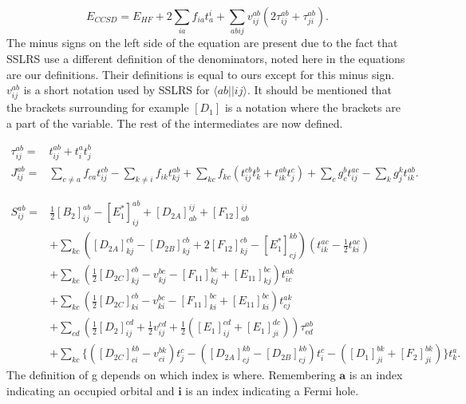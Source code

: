 \begin{equation}
E_{CCSD} = E_{HF} + 2\sum_{ia} f_{ia} t_a^i 
+ \sum_{abij} v_{ij}^{ab} ( 2 \tau_{ij}^{ab}
+ \tau_{ji}^{ab} ) . \label{SSRS3}
\end{equation}
The minus signs on the left side of the equation are present due to the fact that SSLRS use a different definition of the denominators, noted here in the equations are our definitions. Their definitions is equal to ours except for this minus sign. \\

$v_{ij}^{ab}$ is a short notation used by SSLRS for $\langle ab || ij \rangle$. It should be mentioned that the brackets surrounding for example $[D_1]$ is a notation where the brackets are a part of the variable. The rest of the intermediates are now defined.

\begin{align}
\tau_{ij}^{ab} = & t_{ij}^{ab} + t_i^a t_j^b
\\ 
J_{ij}^{ab} = &
\sum_{c \not= a} f_{ca} t_{ij}^{cb}
- \sum_{k \not= i} f_{ik} t_{kj}^{ab}
+ \sum_{kc} f_{kc} (t_{ij}^{cb} t_k^b + t_{ik}^{ab} t_j^c )
+ \sum_c g_c^b t_{ij}^{ac} - \sum_k g_j^k t_{ik}^{ab} .
\end{align}

\begin{align}
S_{ij}^{ab} = & 
\frac{1}{2} [B_2]_{ij}^{ab}
- [E_1^*]_{ij}^{ab}
+ [D_{2A}]_{ab}^{ij}
+ [F_{12}]_{ab}^{ij} 
 \\ &
+ \sum_{kc} (
[D_{2A}]_{kj}^{cb} - [D_{2B}]_{kj}^{cb}
+ 2[F_{12}]_{kj}^{cb}
- [E_1^*]_{cj}^{kb} )
( t_{ik}^{ac} - \frac{1}{2} t_{ki}^{ac} )
\nonumber \\ &
+ \sum_{kc} (\frac{1}{2} [D_{2C}]_{kj}^{cb}
- v_{kj}^{bc} - [F_{11}]_{kj}^{bc} + [E_{11}]_{kj}^{bc}) t_{ic}^{ak}
\nonumber \\ &
+ \sum_{kc} (\frac{1}{2} [D_{2C}]_{ki}^{cb} - v_{ki}^{bc} - [F_{11}]_{ki}^{bc} 
+ [E_{11}]_{ki}^{bc} ) t_{cj}^{ak}
\nonumber \\ &
+ \sum_{cd} ( \frac{1}{2} [D_2]_{ij}^{cd} 
+ \frac{1}{2} v_{ij}^{cd} + \frac{1}{2} (
[E_1]_{ij}^{cd} + [E_1]_{ji}^{dc}))
\tau_{cd}^{ab}
\nonumber \\ &
+ \sum_{kc} \{
([D_{2C}]_{ci}^{kb} - v_{ci}^{bk}) t_j^c
- ([D_{2A}]_{cj}^{kb} 
- [D_{2B}]_{cj}^{kb} ) t_i^c
- ([D_1]_{ji}^{bk} + [F_2]_{ji}^{bk}) \} t_k^a .
\nonumber
\end{align}
The definition of g depends on which index is where. Remembering $\textbf{a}$ is an index indicating an occupied orbital and $\textbf{i}$ is an index indicating a Fermi hole.

